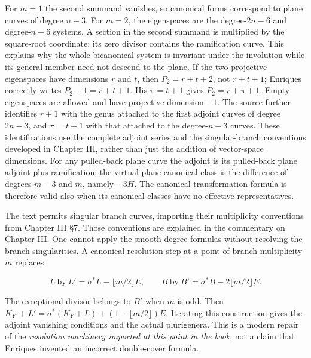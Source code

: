 For \(m=1\) the second summand vanishes, so canonical forms correspond to plane curves of degree \(n-3\). For \(m=2\), the eigenspaces are the degree-\(2n-6\) and degree-\(n-6\) systems. A section in the second summand is multiplied by the square-root coordinate; its zero divisor contains the ramification curve. This explains why the whole bicanonical system is invariant under the involution while its general member need not descend to the plane. If the two projective eigenspaces have dimensions \(r\) and \(t\), then \(P_2=r+t+2\), not \(r+t+1\); Enriques correctly writes \(P_2-1=r+t+1\). His \(\pi=t+1\) gives \(P_2=r+\pi+1\). Empty eigenspaces are allowed and have projective dimension \(-1\). The source further identifies \(r+1\) with the genus attached to the first adjoint curves of degree \(2n-3\), and \(\pi=t+1\) with that attached to the degree-\(n-3\) curves. These identifications use the complete adjoint series and the singular-branch conventions developed in Chapter III, rather than just the addition of vector-space dimensions. For any pulled-back plane curve the adjoint is its pulled-back plane adjoint plus ramification; the virtual plane canonical class is the difference of degrees \(m-3\) and \(m\), namely \(-3H\). The canonical transformation formula is therefore valid also when its canonical classes have no effective representatives.

The text permits singular branch curves, importing their multiplicity conventions from Chapter III §7. Those conventions are explained in the commentary on Chapter III. One cannot apply the smooth degree formulas without resolving the branch singularities. A canonical-resolution step at a point of branch multiplicity \(m\) replaces

\[
L\ \text{by}\ L'=\sigma^*L-\lfloor m/2\rfloor E,\qquad
B\ \text{by}\ B'=\sigma^*B-2\lfloor m/2\rfloor E.
\]

The exceptional divisor belongs to \(B'\) when \(m\) is odd. Then \(K_{Y'}+L'=\sigma^*(K_Y+L)+(1-\lfloor m/2\rfloor)E\). Iterating this construction gives the adjoint vanishing conditions and the actual plurigenera. This is a modern repair of the \emph{resolution machinery imported at this point in the book}, not a claim that Enriques invented an incorrect double-cover formula.

